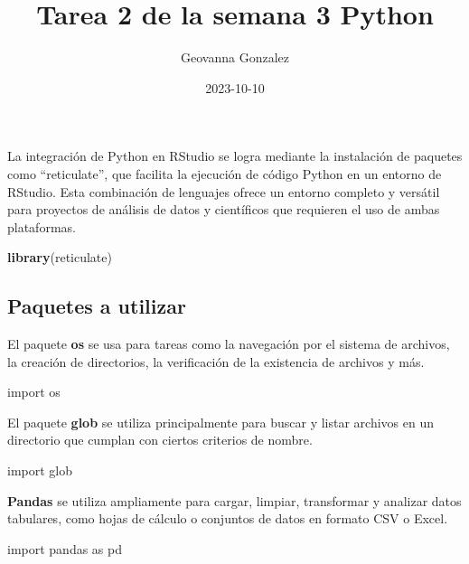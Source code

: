 \documentclass[
]{article}
\title{Tarea 2 de la semana 3 Python}
\author{Geovanna Gonzalez}
\date{2023-10-10}
\newenvironment{Shaded}{\begin{snugshade}}{\end{snugshade}}
\newcommand{\FunctionTok}[1]{\textcolor[rgb]{0.13,0.29,0.53}{\textbf{#1}}}
\newcommand{\ImportTok}[1]{#1}
\newcommand{\NormalTok}[1]{#1}
\begin{document}
\maketitle

La integración de Python en RStudio se logra mediante la instalación de
paquetes como ``reticulate'', que facilita la ejecución de código Python
en un entorno de RStudio. Esta combinación de lenguajes ofrece un
entorno completo y versátil para proyectos de análisis de datos y
científicos que requieren el uso de ambas plataformas.

\begin{Shaded}
\begin{Highlighting}[]
\FunctionTok{library}\NormalTok{(reticulate)}
\end{Highlighting}
\end{Shaded}

\hypertarget{paquetes-a-utilizar}{%
\subsection{Paquetes a utilizar}\label{paquetes-a-utilizar}}

El paquete \textbf{os} se usa para tareas como la navegación por el
sistema de archivos, la creación de directorios, la verificación de la
existencia de archivos y más.

\begin{Shaded}
\begin{Highlighting}[]
\ImportTok{import}\NormalTok{ os}
\end{Highlighting}
\end{Shaded}

El paquete \textbf{glob} se utiliza principalmente para buscar y listar
archivos en un directorio que cumplan con ciertos criterios de nombre.

\begin{Shaded}
\begin{Highlighting}[]
\ImportTok{import}\NormalTok{ glob}
\end{Highlighting}
\end{Shaded}

\textbf{Pandas} se utiliza ampliamente para cargar, limpiar, transformar
y analizar datos tabulares, como hojas de cálculo o conjuntos de datos
en formato CSV o Excel.

\begin{Shaded}
\begin{Highlighting}[]
\ImportTok{import}\NormalTok{ pandas }\ImportTok{as}\NormalTok{ pd}
\end{Highlighting}
\end{Shaded}
\end{document}
